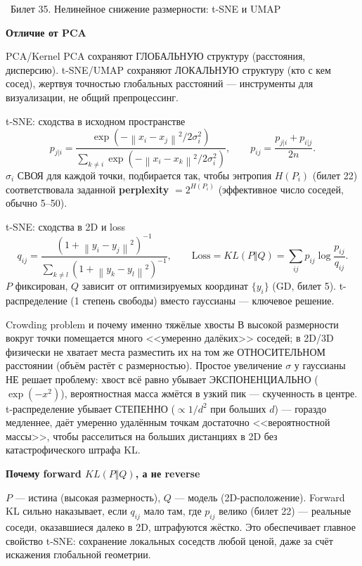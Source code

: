 \documentclass[12pt, a4paper]{article}
\newcommand{\bilet}[2]{%
  \vspace{10pt}%
  \noindent\colorbox{qcolor}{\parbox{\dimexpr\linewidth-2\fboxsep\relax}{%
    \color{white}\large\bfseries\strut\ Билет #1. #2%
  }}%
  \nopagebreak\vspace{5pt}\par\nopagebreak%
}
\newcommand{\qsub}[1]{%
  \vspace{5pt}%
  {\bfseries\color{defblue} #1}%
  \par\vspace{2pt}%
}
\newcommand{\norm}[1]{\left\lVert #1 \right\rVert}
\begin{document}
\bilet{35}{Нелинейное снижение размерности: t-SNE и UMAP}

\qsub{Отличие от PCA}
PCA/Kernel PCA сохраняют ГЛОБАЛЬНУЮ структуру (расстояния, дисперсию). t-SNE/UMAP сохраняют ЛОКАЛЬНУЮ структуру (кто с кем сосед), жертвуя точностью глобальных расстояний --- инструменты для визуализации, не общий препроцессинг.

\begin{defbox}{t-SNE: сходства в исходном пространстве}
\[
  p_{j|i} = \frac{\exp(-\norm{x_i-x_j}^2/2\sigma_i^2)}{\sum_{k\ne i}\exp(-\norm{x_i-x_k}^2/2\sigma_i^2)}, \qquad p_{ij} = \frac{p_{j|i}+p_{i|j}}{2n}.
\]
$\sigma_i$ СВОЯ для каждой точки, подбирается так, чтобы энтропия $H(P_i)$ (билет 22) соответствовала заданной \textbf{perplexity} $= 2^{H(P_i)}$ (эффективное число соседей, обычно 5--50).
\end{defbox}

\begin{defbox}{t-SNE: сходства в 2D и loss}
\[
  q_{ij} = \frac{(1+\norm{y_i-y_j}^2)^{-1}}{\sum_{k\ne l}(1+\norm{y_k-y_l}^2)^{-1}}, \qquad \text{Loss} = KL(P\Vert Q) = \sum_{ij} p_{ij}\log\frac{p_{ij}}{q_{ij}}.
\]
$P$ фиксирован, $Q$ зависит от оптимизируемых координат $\{y_i\}$ (GD, билет 5). t-распределение (1 степень свободы) вместо гауссианы --- ключевое решение.
\end{defbox}

\begin{proofbox}{Crowding problem и почему именно тяжёлые хвосты}
В высокой размерности вокруг точки помещается много <<умеренно далёких>> соседей; в 2D/3D физически не хватает места разместить их на том же ОТНОСИТЕЛЬНОМ расстоянии (объём растёт с размерностью). Простое увеличение $\sigma$ у гауссианы НЕ решает проблему: хвост всё равно убывает ЭКСПОНЕНЦИАЛЬНО ($\exp(-x^2)$), вероятностная масса жмётся в узкий пик --- скученность в центре. t-распределение убывает СТЕПЕННО ($\propto 1/d^2$ при больших $d$) --- гораздо медленнее, даёт умеренно удалённым точкам достаточно <<вероятностной массы>>, чтобы расселиться на больших дистанциях в 2D без катастрофического штрафа KL.
\end{proofbox}

\qsub{Почему forward $KL(P\Vert Q)$, а не reverse}
$P$ --- истина (высокая размерность), $Q$ --- модель (2D-расположение). Forward KL сильно наказывает, если $q_{ij}$ мало там, где $p_{ij}$ велико (билет 22) --- реальные соседи, оказавшиеся далеко в 2D, штрафуются жёстко. Это обеспечивает главное свойство t-SNE: сохранение локальных соседств любой ценой, даже за счёт искажения глобальной геометрии.
\end{document}
